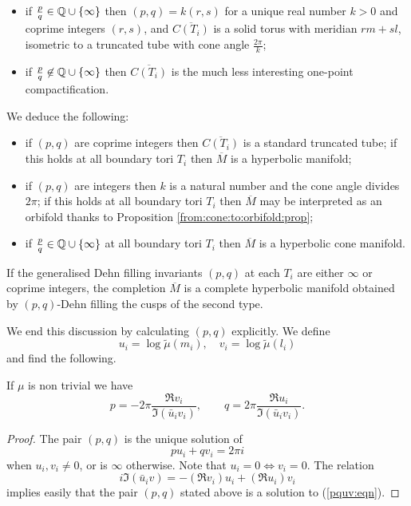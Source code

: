 \begin{itemize}
\item if $\frac pq\in\mathbb{Q}\cup \{\infty\}$ then $(p,q) = k(r,s)$ for a unique real number $k>0$ and coprime integers $(r,s)$, and $\overline{C(T_i)}$ is a solid torus with meridian $rm+sl$, isometric to a truncated tube with cone angle $\frac{2\pi}k$;
\item if $\frac pq \not\in \mathbb{Q} \cup \{\infty\}$ then $\overline{C(T_i)}$ is the much less interesting one-point compactification.
\end{itemize}
We deduce the following:
\begin{itemize}
\item if $(p,q)$ are coprime integers then $\overline{C(T_i)}$ is a standard truncated tube; if this holds at all boundary tori $T_i$ then $\overline M$ is a hyperbolic manifold; 
\item if $(p,q)$ are integers then $k$ is a natural number and the cone angle divides $2\pi$; if this holds at all boundary tori $T_i$ then $\overline M$ may be interpreted as an orbifold thanks to Proposition \ref{from:cone:to:orbifold:prop};
\item if $\frac pq \in \mathbb{Q}\cup \{\infty\}$ at all boundary tori $T_i$ then $\overline M$ is a hyperbolic cone manifold.
\end{itemize}

\begin{cor}
If the generalised Dehn filling invariants $(p,q)$ at each $T_i$ are either $\infty$ or coprime integers, the completion $\overline M$ is a complete hyperbolic manifold obtained by $(p,q)$-Dehn filling the cusps of the second type.
\end{cor}

We end this discussion by calculating $(p,q)$ explicitly. We define
$$u_i = \log \tilde \mu(m_i), \quad v_i = \log \tilde \mu(l_i)$$
and find the following.
\begin{prop} \label{pq:explicit:prop}
If $\mu$ is non trivial we have
$$p = - 2\pi\frac{\Re v_i}{\Im(\bar u_iv_i)}, \qquad 
q = 2\pi\frac{\Re u_i}{\Im(\bar u_iv_i)}.$$
\end{prop}
\begin{proof}
The pair $(p,q)$ is the unique solution of  
\begin{equation} \label{pquv:eqn}
pu_i + qv_i = 2\pi i
\end{equation}
when $u_i,v_i \neq 0$, or is $\infty$ otherwise. Note that $u_i=0 \Leftrightarrow v_i=0$.
The relation
$$i\Im (\bar u_iv) = -(\Re v_i)u_i + (\Re u_i)v_i$$
implies easily that the pair $(p,q)$ stated above is a solution to (\ref{pquv:eqn}).
\end{proof}


